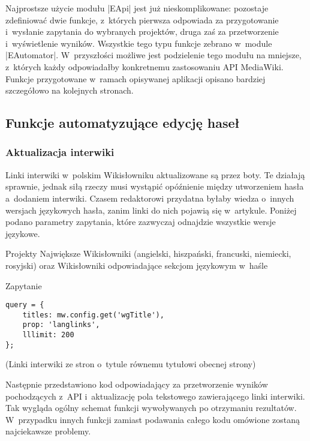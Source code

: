 Najprostsze użycie modułu \kod|EApi| jest już nieskomplikowane: pozostaje zdefiniować dwie funkcje, z~których pierwsza odpowiada za przygotowanie i~wysłanie zapytania do wybranych projektów, druga zaś za przetworzenie i~wyświetlenie wyników. Wszystkie tego typu funkcje zebrano w~module \kod|EAutomator|. W~przyszłości możliwe jest podzielenie tego modułu na mniejsze, z~których każdy odpowiadałby konkretnemu zastosowaniu API MediaWiki. Funkcje przygotowane w~ramach opisywanej aplikacji opisano bardziej szczegółowo na kolejnych stronach.

\subsection{Funkcje automatyzujące edycję haseł}

\subsubsection{Aktualizacja interwiki}
Linki interwiki w~polskim Wikisłowniku aktualizowane są przez boty. Te działają sprawnie, jednak siłą rzeczy musi wystąpić opóźnienie między utworzeniem hasła a~dodaniem interwiki. Czasem redaktorowi przydatna byłaby wiedza o~innych wersjach językowych hasła, zanim linki do nich pojawią się w~artykule. Poniżej podano parametry zapytania, które zazwyczaj odnajdzie wszystkie wersje językowe.

\begin{opis}
\item[Projekty] Największe Wikisłowniki (angielski, hiszpański, francuski, niemiecki, rosyjski) oraz Wikisłowniki odpowiadające sekcjom językowym w~haśle
\item[Zapytanie]
\begin{verbatim}
query = {
    titles: mw.config.get('wgTitle'),
    prop: 'langlinks',
    lllimit: 200
};
\end{verbatim}
(Linki interwiki ze stron o~tytule równemu tytułowi obecnej strony)
\end{opis}

Następnie przedstawiono kod odpowiadający za przetworzenie wyników pochodzących z~API i~aktualizację pola tekstowego zawierającego linki interwiki. Tak wygląda ogólny schemat funkcji wywoływanych po otrzymaniu rezultatów. W~przypadku innych funkcji zamiast podawania całego kodu omówione zostaną najciekawsze problemy.


